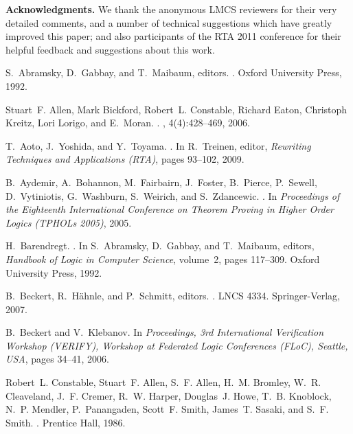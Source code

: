 \documentclass{LMCS}
\begin{document}
\textbf{Acknowledgments.} We thank the anonymous LMCS reviewers for
their very detailed comments, and a number of technical suggestions
which have greatly improved this paper; and also participants of the
RTA 2011 conference for their helpful feedback and suggestions about
this work.



\begin{thebibliography}{10}

S.~Abramsky, D.~Gabbay, and T.~Maibaum, editors.
.
\newblock Oxford University Press, 1992.

Stuart~F. Allen, Mark Bickford, Robert~L. Constable, Richard Eaton, Christoph
  Kreitz, Lori Lorigo, and E.~Moran.
.
, 4(4):428--469, 2006.

T.~Aoto, J.~Yoshida, and Y.~Toyama.
.
\newblock In R.~Treinen, editor, {\em Rewriting Techniques and Applications
  (RTA)}, pages 93--102, 2009.

B.~Aydemir, A.~Bohannon, M.~Fairbairn, J.~Foster, B.~Pierce, P.~Sewell,
  D.~Vytiniotis, G.~Washburn, S.~Weirich, and S.~Zdancewic.
.
\newblock In {\em Proceedings of the Eighteenth International Conference on
  Theorem Proving in Higher Order Logics (TPHOLs 2005)}, 2005.

H.~Barendregt.
.
\newblock In S.~Abramsky, D.~Gabbay, and T.~Maibaum, editors, {\em {Handbook of
  Logic in Computer Science}}, volume~2, pages 117--309. Oxford University
  Press, 1992.

B.~Beckert, R.~H\"ahnle, and P.~Schmitt, editors.
.
\newblock LNCS 4334. Springer-Verlag, 2007.

B.~Beckert and V.~Klebanov.
\newblock In {\em Proceedings, 3rd International Verification Workshop
  (VERIFY), Workshop at Federated Logic Conferences (FLoC), Seattle, USA},
  pages 34--41, 2006.

Robert~L. Constable, Stuart~F. Allen, S.~F. Allen, H.~M. Bromley, W.~R.
  Cleaveland, J.~F. Cremer, R.~W. Harper, Douglas~J. Howe, T.~B. Knoblock,
  N.~P. Mendler, P.~Panangaden, Scott~F. Smith, James~T. Sasaki, and S.~F.
  Smith.
.
\newblock Prentice Hall, 1986.


\end{thebibliography}
\end{document}
